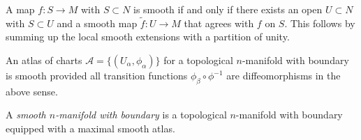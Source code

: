\begin{remark}
A map $f: S \to M$ with $S \subset N$ is smooth if and only if there
exists an open $U \subset N$ with $S \subset U$ and a smooth map
$\tilde{f}: U \to M$ that agrees with $f$ on $S$. This follows by
summing up the local smooth extensions with a partition of unity.
\end{remark}

\begin{defn}
An atlas of charts $\mathcal{A} = \{(U_\alpha, \phi_\alpha)\}$ for a
topological $n$-manifold with boundary is smooth provided all
transition functions $\phi_\beta \circ \phi^{-1}$ are diffeomorphisms
in the above sense.

A \emph{smooth $n$-manifold with boundary} is a topological
$n$-manifold with boundary equipped with a maximal smooth atlas.
\end{defn}
